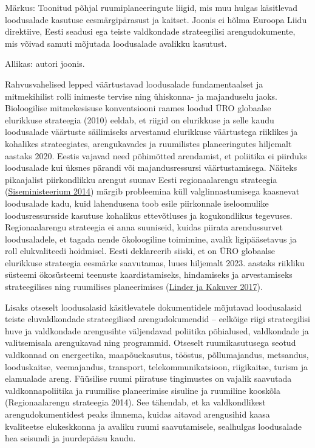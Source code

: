 \documentclass[estonian,]{article}
\begin{document}
\begin{figure-comment}
{Märkus:} Toonitud põhjal ruumiplaneeringute liigid, mis muu hulgas
käsitlevad loodusalade kasutuse eesmärgipärasust ja kaitset. Joonis ei
hõlma Euroopa Liidu direktiive, Eesti seadusi ega teiste valdkondade
strateegilisi arengudokumente, mis võivad samuti mõjutada loodusalade
avalikku kasutust.
\end{figure-comment}

\begin{imgsource}
{Allikas:} autori joonis.
\end{imgsource}

Rahvusvahelised lepped väärtustavad loodusalade fundamentaalset ja mitmekihilist rolli inimeste tervise ning ühiskonna- ja majanduselu jaoks. Bioloogilise mitmekesisuse konventsiooni raames loodud ÜRO globaalse elurikkuse strateegia (2010) eeldab, et riigid on elurikkuse ja selle kaudu loodusalade väärtuste säilimiseks arvestanud elurikkuse väärtustega riiklikes ja kohalikes strateegiates, arengukavades ja ruumilistes planeeringutes hiljemalt aastaks 2020. Eestis vajavad need põhimõtted arendamist, et poliitika ei piirduks loodusalade kui üksnes pärandi või majandusressursi väärtustamisega. Näiteks pikaajalist piirkondlikku arengut suunav Eesti regionaalarengu strateegia (\protect\hyperlink{Siseministeerium2014}{Siseministeerium 2014}) märgib probleemina küll valglinnastumisega kaasnevat loodusalade kadu, kuid lahendusena toob esile piirkonnale iseloomulike loodusressursside kasutuse kohalikus ettevõtluses ja kogukondlikus tegevuses. Regionaalarengu strateegia ei anna suuniseid, kuidas piirata arendussurvet loodusaladele, et tagada nende ökoloogiline toimimine, avalik ligipääsetavus ja roll elukvaliteedi hoidmisel. Eesti deklareerib siiski, et on ÜRO globaalse elurikkuse strateegia eesmärke saavutamas, luues hiljemalt 2023. aastaks riikliku süsteemi ökosüsteemi teenuste kaardistamiseks, hindamiseks ja arvestamiseks strateegilises ning ruumilises planeerimises (\protect\hyperlink{Linder2017}{Linder ja Kakuver 2017}).

Lisaks otseselt loodusalasid käsitlevatele dokumentidele mõjutavad loodusalasid teiste eluvaldkondade strateegilised arengudokumendid -- eelkõige riigi strateegilisi huve ja valdkondade arengusihte väljendavad poliitika põhialused, valdkondade ja valitsemisala arengukavad ning programmid. Otseselt ruumikasutusega seotud valdkonnad on energeetika, maapõuekasutus, tööstus, põllumajandus, metsandus, looduskaitse, veemajandus, transport, telekommunikatsioon, riigikaitse, turism ja elamualade areng. Füüsilise ruumi piiratuse tingimustes on vajalik saavutada valdkonnapoliitika ja ruumilise planeerimise sisuline ja ruumiline kooskõla (Regionaalarengu strateegia 2014). See tähendab, et ka valdkondlikest arengudokumentidest peaks ilmnema, kuidas aitavad arengusihid kaasa kvaliteetse elukeskkonna ja avaliku ruumi saavutamisele, sealhulgas loodusalade hea seisundi ja juurdepääsu kaudu.
\end{document}

